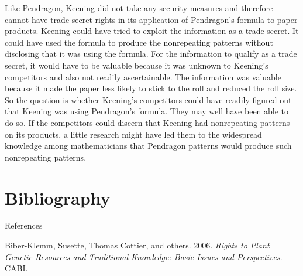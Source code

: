 \documentclass[ignorenonframetext,aspectratio=169]{beamer}
\begin{document}
\begin{frame}{}
\protect\hypertarget{section-14}{}

\footnotesize

Like Pendragon, Keening did not take any security measures and therefore
cannot have trade secret rights in its application of Pendragon's
formula to paper products. Keening could have tried to exploit the
information as a trade secret. It could have used the formula to produce
the nonrepeating patterns without disclosing that it was using the
formula. For the information to qualify as a trade secret, it would have
to be valuable because it was unknown to Keening's competitors and also
not readily ascertainable. The information was valuable because it made
the paper less likely to stick to the roll and reduced the roll size. So
the question is whether Keening's competitors could have readily figured
out that Keening was using Pendragon's formula. They may well have been
able to do so. If the competitors could discern that Keening had
nonrepeating patterns on its products, a little research might have led
them to the widespread knowledge among mathematicians that Pendragon
patterns would produce such nonrepeating patterns.

\end{frame}

\hypertarget{bibliography}{%
\section{Bibliography}\label{bibliography}}

\begin{frame}{References}
\protect\hypertarget{references}{}

\hypertarget{refs}{}
\leavevmode\hypertarget{ref-biber2006rights}{}%
Biber-Klemm, Susette, Thomas Cottier, and others. 2006. \emph{Rights to
Plant Genetic Resources and Traditional Knowledge: Basic Issues and
Perspectives}. CABI.

\end{frame}
\end{document}

